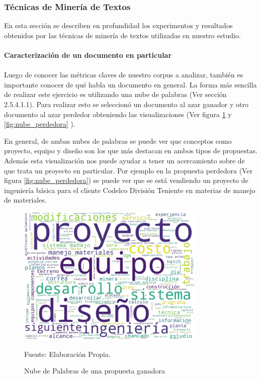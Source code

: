 \subsubsection{Técnicas de Minería de Textos}
    En esta sección se describen en profundidad los experimentos y resultados obtenidos por las técnicas de minería de textos utilizadas en nuestro estudio. 
    
\paragraph{Caracterización de un documento en particular}
\paragraph*{}
    Luego de conocer las métricas claves de nuestro corpus a analizar, también es importante conocer de qué habla un documento en general. La forma más sencilla de realizar este ejercicio es utilizando una nube de palabras (Ver sección 2.5.4.1.1). Para realizar esto se seleccionó un documento al azar ganador y otro documento al azar perdedor obteniendo las visualizaciones (Ver figura \ref{fig:nube_ganadora} y \ref{fig:nube_perdedora} ). 
    
    En general, de ambas nubes de palabras se puede ver que conceptos como proyecto, equipo y diseño son los que más destacan en ambos tipos de propuestas. Además esta visualización nos puede ayudar a tener un acercamiento sobre de que trata un proyecto en particular. Por ejemplo en la propuesta perdedora (Ver figura \ref{fig:nube_perdedora}) se puede ver que se está vendiendo un proyecto de ingeniería básica para el cliente Codelco División Teniente en materias de manejo de materiales. 

\begin{figure}[H]
\centering
\includegraphics[width=0.8\textwidth]{figures/KeyWords/nube_ganadora.png}
\caption{\label{fig:nube_ganadora} Nube de Palabras de una propuesta ganadora} Fuente: Elaboración Propia.
\end{figure}

